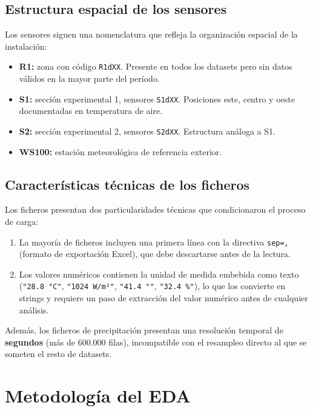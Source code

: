 \documentclass[12pt, a4paper]{article}
\begin{document}
\subsection{Estructura espacial de los sensores}

Los sensores siguen una nomenclatura que refleja la organización espacial de la instalación:

\begin{itemize}[leftmargin=1.5cm]
    \item \textbf{R1:} zona con código \texttt{R1dXX}. Presente en todos los datasets pero sin datos válidos en la mayor parte del período.
    \item \textbf{S1:} sección experimental 1, sensores \texttt{S1dXX}. Posiciones este, centro y oeste documentadas en temperatura de aire.
    \item \textbf{S2:} sección experimental 2, sensores \texttt{S2dXX}. Estructura análoga a S1.
    \item \textbf{WS100:} estación meteorológica de referencia exterior.
\end{itemize}

\subsection{Características técnicas de los ficheros}

Los ficheros presentan dos particularidades técnicas que condicionaron el proceso de carga:

\begin{enumerate}[leftmargin=1.5cm]
    \item La mayoría de ficheros incluyen una primera línea con la directiva \texttt{sep=,} (formato de exportación Excel), que debe descartarse antes de la lectura.
    \item Los valores numéricos contienen la unidad de medida embebida como texto (\texttt{"28.8 °C"}, \texttt{"1024 W/m²"}, \texttt{"41.4 °"}, \texttt{"32.4 \%"}), lo que los convierte en strings y requiere un paso de extracción del valor numérico antes de cualquier análisis.
\end{enumerate}

Además, los ficheros de precipitación presentan una resolución temporal de \textbf{segundos} (más de 600.000 filas), incompatible con el resampleo directo al que se someten el resto de datasets.

\section{Metodología del EDA}
\end{document}
